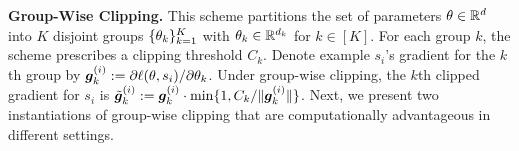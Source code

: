 \textbf{Group-Wise Clipping.} 
This scheme partitions the set of parameters $\mathbf{\theta} \in \mathbb{R}^d$ into $K$ disjoint groups $\{\mathbf{\theta}_k  \}_{k=1}^K$ with  $\mathbf{\theta}_k \in \mathbb{R}^{d_k}$ for $k\in [K]$.
For each group $k$, the scheme prescribes a clipping threshold $C_k$. 
Denote example $s_i$'s gradient for the $k$th group by $\bm{g}_k^{(i)}:= {\partial \ell(\mathbf{\theta}, s_i)} / {\partial \mathbf{\theta}_k}$.
Under group-wise clipping, the $k$th clipped gradient for $s_i$ is 
$\tilde{\bm{g}}_k^{(i)} := \bm{g}_k^{(i)}\cdot \min\{1, C_k / {\|\bm{g}_k^{(i)}\|}\}$.
Next, we present two instantiations of group-wise clipping that are computationally advantageous in different settings.






